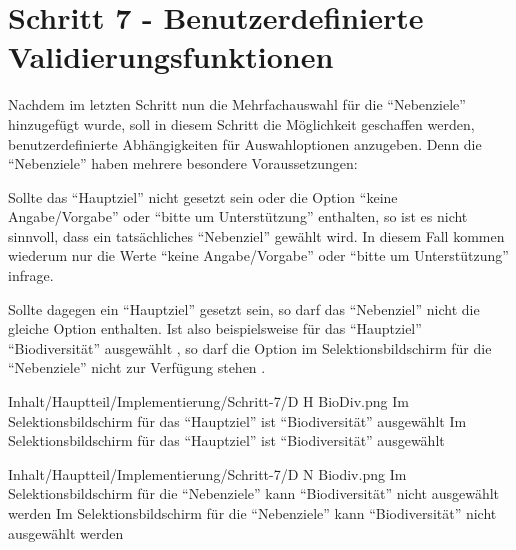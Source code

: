 \chapter{Schritt 7 - Benutzerdefinierte Validierungsfunktionen}
\label{chap:Schritt-7}


Nachdem im letzten Schritt nun die Mehrfachauswahl für die \enquote{Nebenziele} hinzugefügt wurde,
soll in diesem Schritt die Möglichkeit geschaffen werden,
benutzerdefinierte Abhängigkeiten für Auswahloptionen anzugeben.
Denn die \enquote{Nebenziele} haben mehrere besondere Voraussetzungen:

Sollte das \enquote{Hauptziel} nicht gesetzt sein oder die Option \enquote{keine Angabe/Vorgabe} oder \enquote{bitte um Unterstützung} enthalten,
  so ist es nicht sinnvoll, dass ein tatsächliches \enquote{Nebenziel} gewählt wird.
  In diesem Fall kommen wiederum nur die Werte \enquote{keine Angabe/Vorgabe} oder \enquote{bitte um Unterstützung} infrage.

Sollte dagegen ein \enquote{Hauptziel} gesetzt sein, so darf das \enquote{Nebenziel} nicht die gleiche Option enthalten.
  Ist also beispielsweise für das \enquote{Hauptziel} \enquote{Biodiversität} ausgewählt \Abb{\ref{fig:Schritt4EingabemaskeDHBioDiv}},
  so darf die Option im Selektionsbildschirm für die \enquote{Nebenziele} nicht zur Verfügung stehen \Abb{\ref{fig:Schritt4EingabemaskeDNBiodiv}}.






\begin{alexfigure}{Inhalt/Hauptteil/Implementierung/Schritt-7/D H BioDiv.png}
  {Im Selektionsbildschirm für das \enquote{Hauptziel} ist \enquote{Biodiversität} ausgewählt}
  {Im Selektionsbildschirm für das \enquote{Hauptziel} ist \enquote{Biodiversität} ausgewählt}

  \label{fig:Schritt4EingabemaskeDHBioDiv}

\end{alexfigure}

\begin{alexfigure}{Inhalt/Hauptteil/Implementierung/Schritt-7/D N Biodiv.png}
  {Im Selektionsbildschirm für die \enquote{Nebenziele} kann \enquote{Biodiversität} nicht ausgewählt werden}
  {Im Selektionsbildschirm für die \enquote{Nebenziele} kann \enquote{Biodiversität} nicht ausgewählt werden}

  \label{fig:Schritt4EingabemaskeDNBiodiv}

\end{alexfigure}

